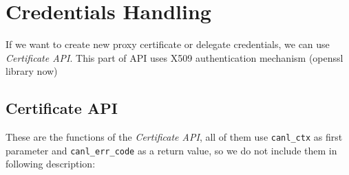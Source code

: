 %
%

\section{Credentials Handling}
\label{s:cred-handling}

If we want to create new proxy certificate or \eg delegate
credentials, we can use \CANL \textit{Certificate API}.
This part of API uses X509 authentication mechanism 
(openssl library now)

\subsection{Certificate API}
These are the functions of the \textit{Certificate API}, all of them use
{\tt canl\_ctx} as first parameter and {\tt canl\_err\_code} as a return
value, so we do not include them in following description:

